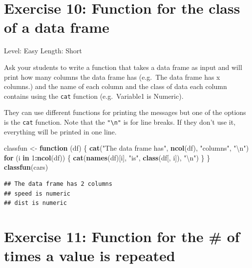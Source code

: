 \documentclass[]{book}
\newenvironment{Shaded}{\begin{snugshade}}{\end{snugshade}}
\newcommand{\CharTok}[1]{\textcolor[rgb]{0.31,0.60,0.02}{#1}}
\newcommand{\ControlFlowTok}[1]{\textcolor[rgb]{0.13,0.29,0.53}{\textbf{#1}}}
\newcommand{\DecValTok}[1]{\textcolor[rgb]{0.00,0.00,0.81}{#1}}
\newcommand{\KeywordTok}[1]{\textcolor[rgb]{0.13,0.29,0.53}{\textbf{#1}}}
\newcommand{\NormalTok}[1]{#1}
\newcommand{\OperatorTok}[1]{\textcolor[rgb]{0.81,0.36,0.00}{\textbf{#1}}}
\newcommand{\StringTok}[1]{\textcolor[rgb]{0.31,0.60,0.02}{#1}}
\begin{document}
\hypertarget{exercise-10-function-for-the-class-of-a-data-frame}{%
\section*{Exercise 10: Function for the class of a data frame}\label{exercise-10-function-for-the-class-of-a-data-frame}}

Level: Easy
Length: Short

Ask your students to write a function that takes a data frame as input and will print how many columns the data frame has (e.g.~The data frame has x columns.) and the name of each column and the class of data each column contains using the \texttt{cat} function (e.g.~Variable1 is Numeric).

They can use different functions for printing the messages but one of the options is the \texttt{cat} function. Note that the \texttt{"\textbackslash{}n"} is for line breaks. If they don't use it, everything will be printed in one line.

\begin{Shaded}
\begin{Highlighting}[]
\NormalTok{classfun <-}\StringTok{ }\ControlFlowTok{function}\NormalTok{ (df) \{}
    \KeywordTok{cat}\NormalTok{(}\StringTok{"The data frame has"}\NormalTok{, }\KeywordTok{ncol}\NormalTok{(df), }\StringTok{"columns"}\NormalTok{, }\StringTok{"}\CharTok{\textbackslash{}n}\StringTok{"}\NormalTok{)}
    \ControlFlowTok{for}\NormalTok{ (i }\ControlFlowTok{in} \DecValTok{1}\OperatorTok{:}\KeywordTok{ncol}\NormalTok{(df)) \{}
        \KeywordTok{cat}\NormalTok{(}\KeywordTok{names}\NormalTok{(df)[i], }\StringTok{"is"}\NormalTok{, }\KeywordTok{class}\NormalTok{(df[, i]), }\StringTok{"}\CharTok{\textbackslash{}n}\StringTok{"}\NormalTok{)}
\NormalTok{        \}}
\NormalTok{\}}
\KeywordTok{classfun}\NormalTok{(cars)}
\end{Highlighting}
\end{Shaded}

\begin{verbatim}
## The data frame has 2 columns 
## speed is numeric 
## dist is numeric
\end{verbatim}

\hypertarget{exercise-11-function-for-the-of-times-a-value-is-repeated}{%
\section*{Exercise 11: Function for the \# of times a value is repeated}\label{exercise-11-function-for-the-of-times-a-value-is-repeated}}
\end{document}

